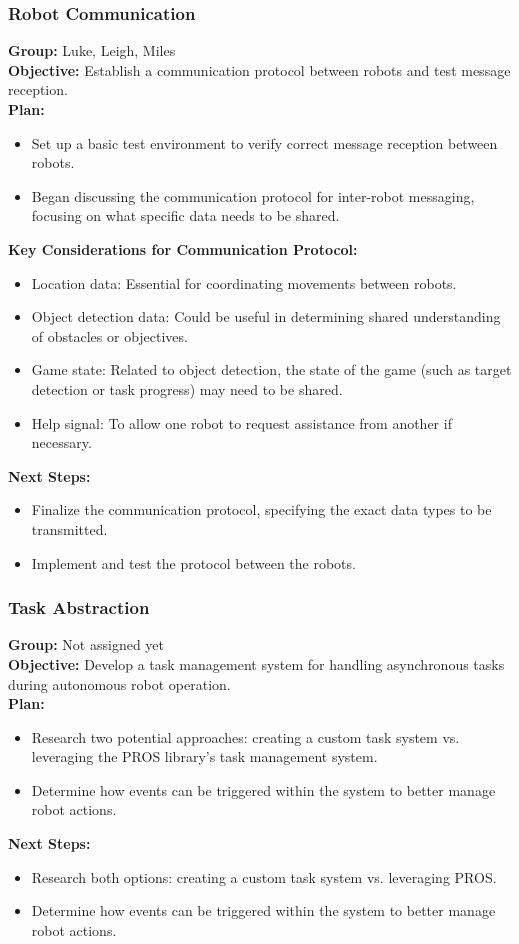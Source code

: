\subsubsection{Robot Communication}
\textbf{Group:} Luke, Leigh, Miles\\
\textbf{Objective:} Establish a communication protocol between robots and test message reception.\\
\textbf{Plan:}
\begin{itemize}
  \item Set up a basic test environment to verify correct message reception between robots.
  \item Began discussing the communication protocol for inter-robot messaging, focusing on what specific data needs to be shared.
\end{itemize}
\textbf{Key Considerations for Communication Protocol:}
\begin{itemize}
  \item Location data: Essential for coordinating movements between robots.
  \item Object detection data: Could be useful in determining shared understanding of obstacles or objectives.
  \item Game state: Related to object detection, the state of the game (such as target detection or task progress) may need to be shared.
  \item Help signal: To allow one robot to request assistance from another if necessary.
\end{itemize}
\textbf{Next Steps:}
\begin{itemize}
  \item Finalize the communication protocol, specifying the exact data types to be transmitted.
  \item Implement and test the protocol between the robots.
\end{itemize}

\subsubsection{Task Abstraction}
\textbf{Group:} Not assigned yet\\
\textbf{Objective:} Develop a task management system for handling asynchronous tasks during autonomous robot operation.\\
\textbf{Plan:}
\begin{itemize}
  \item Research two potential approaches: creating a custom task system vs. leveraging the PROS library's task management system.
  \item Determine how events can be triggered within the system to better manage robot actions.
\end{itemize}
\textbf{Next Steps:}
\begin{itemize}
  \item Research both options: creating a custom task system vs. leveraging PROS.
  \item Determine how events can be triggered within the system to better manage robot actions.
\end{itemize}

